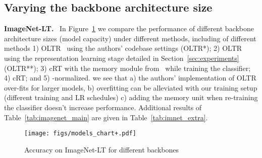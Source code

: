 \documentclass[dvipsnames]{article} \usepackage{iclr2020_conference, times}
\newcommand{\header}[1]{\noindent\textbf{#1.}~}
\newcommand{\retrain}{cRT\xspace}
\newcommand{\wnorm}{-normalized\xspace}
\begin{document}
\subsection{Varying the backbone architecture size}
\label{sec:modelsize}


\header{ImageNet-LT} In Figure~\ref{fig:modelsize} we compare the performance of different backbone architecture sizes (model capacity) under different methods, including of different methods 1) OLTR~\citep{liu2019large} using the authors' codebase settings (OLTR*); 2) OLTR using the representation learning stage detailed in Section~\ref{sec:experiments} (OLTR**); 3) \retrain with the memory module from~\citet{liu2019large} while training the classifier; 4) \retrain; and 5) \wnorm. we see that a) the authors' implementation of OLTR over-fits for larger models, b) overfitting can be alleviated with our training setup (different training and LR schedules) c) adding the memory unit when re-training the classifier doesn't increase performance. Additional results of Table~\ref{tab:imagenet_main} are given in Table~\ref{tab:imnet_extra}. 

\begin{figure}[h]
    \vspace{-1cm}
    \centering
    \texttt{[image: figs/models\_chart+.pdf]}
    \caption{Accuracy on ImageNet-LT for different backbones}
    \label{fig:modelsize}
    \vspace{-0.5cm}
\end{figure}
\end{document}
